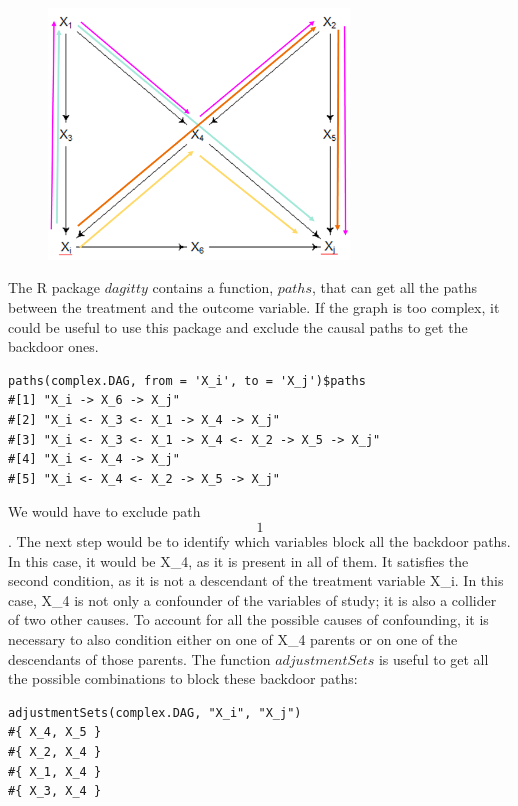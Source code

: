 \documentclass{article}
\begin{document}
\begin{figure}[h]
\includegraphics[width=8cm]{complex.DAG.arrows.png}
\centering
\end{figure}
The R package \(dagitty\) contains a function, \(paths\), that can get all the paths between the treatment and the outcome variable. If the graph is too complex, it could be useful to use this package and exclude the causal paths to get the backdoor ones.
\begin{lstlisting}
paths(complex.DAG, from = 'X_i', to = 'X_j')$paths
#[1] "X_i -> X_6 -> X_j"                            
#[2] "X_i <- X_3 <- X_1 -> X_4 -> X_j"              
#[3] "X_i <- X_3 <- X_1 -> X_4 <- X_2 -> X_5 -> X_j"
#[4] "X_i <- X_4 -> X_j"                            
#[5] "X_i <- X_4 <- X_2 -> X_5 -> X_j"
\end{lstlisting}
We would have to exclude path \[1\].
The next step would be to identify which variables block all the backdoor paths. In this case, it would be X\_4, as it is present in all of them. It satisfies the second condition, as it is not a descendant of the treatment variable X\_i. In this case, X\_4 is not only a confounder of the variables of study; it is also a collider of two other causes. To account for all the possible causes of confounding, it is necessary to also condition either on one of X\_4 parents or on one of the descendants of those parents. The function \(adjustmentSets\) is useful to get all the possible combinations to block these backdoor paths:

\begin{lstlisting}
adjustmentSets(complex.DAG, "X_i", "X_j")
#{ X_4, X_5 }
#{ X_2, X_4 }
#{ X_1, X_4 }
#{ X_3, X_4 }
\end{lstlisting}
\end{document}
